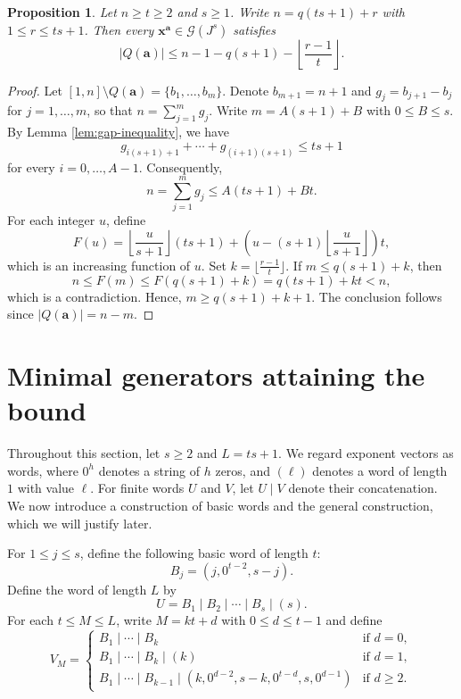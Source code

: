 \documentclass[12pt]{amsart}
\newtheorem{proposition}[theorem]{Proposition}
\theoremstyle{definition}
\theoremstyle{remark}
\numberwithin{equation}{section}
\begin{document}
\begin{proposition}\label{prop:exchange-bound}
Let $n \ge t \ge 2$ and $s \ge 1$. Write $n = q(ts+1) + r$ with $1 \le r \le ts+1$. Then every $\mathbf{x}^{\mathbf{a}} \in \mathcal{G}(J^s)$ satisfies
\[
|Q(\mathbf{a})| \le n - 1 - q(s+1) - \left\lfloor \frac{r-1}{t} \right\rfloor.
\]
\end{proposition}

\begin{proof}
Let $[1, n] \setminus Q(\mathbf{a}) = \{b_1, \ldots, b_m\}$. Denote $b_{m+1} = n+1$ and $g_j = b_{j+1} - b_j$ for $j = 1, \ldots, m$, so that $n = \sum_{j=1}^m g_j$. Write $m = A(s+1) + B$ with $0 \le B \le s$. By Lemma \ref{lem:gap-inequality}, we have
\[
g_{i(s+1) + 1} + \cdots + g_{(i+1)(s+1)} \le ts + 1
\]
for every $i = 0, \ldots, A-1$. Consequently,
\[
n = \sum_{j=1}^m g_j \le A(ts+1) + Bt.
\]
For each integer $u$, define
\[
F(u) = \left\lfloor \frac{u}{s+1} \right\rfloor (ts+1) + \left(u - (s+1)\left\lfloor \frac{u}{s+1} \right\rfloor \right) t,
\]
which is an increasing function of $u$. Set $k = \lfloor \frac{r-1}{t} \rfloor$. If $m \le q(s+1) + k$, then
\[
n \le F(m) \le F(q(s+1) + k) = q(ts+1) + kt < n,
\]
which is a contradiction. Hence, $m \ge q(s+1) + k + 1$. The conclusion follows since $|Q(\mathbf{a})| = n - m$.
\end{proof}

\section{Minimal generators attaining the bound}\label{sec:extremal}
Throughout this section, let $s \ge 2$ and $L = ts + 1$. We regard exponent vectors as words, where $0^h$ denotes a string of $h$ zeros, and $(\ell)$ denotes a word of length $1$ with value $\ell$. For finite words $U$ and $V$, let $U \mid V$ denote their concatenation. We now introduce a construction of basic words and the general construction, which we will justify later.

For $1 \le j \le s$, define the following basic word of length $t$:
\[
B_j = (j, 0^{t-2}, s-j).
\]
Define the word of length $L$ by
\[
U = B_1 \mid B_2 \mid \cdots \mid B_s \mid (s).
\]
For each $t \le M \le L$, write $M = kt + d$ with $0 \le d \le t-1$ and define
\[
V_M = \begin{cases} 
B_1 \mid \cdots \mid B_k & \text{if } d = 0, \\ 
B_1 \mid \cdots \mid B_k \mid (k) & \text{if } d = 1, \\ 
B_1 \mid \cdots \mid B_{k-1} \mid (k, 0^{d-2}, s-k, 0^{t-d}, s, 0^{d-1}) & \text{if } d \ge 2. 
\end{cases}
\]
\end{document}
